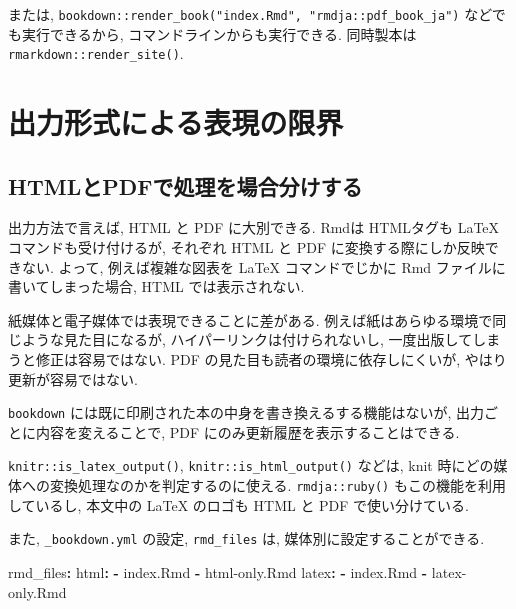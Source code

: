 \documentclass[
]{bxjsbook}
\newenvironment{Shaded}{\begin{snugshade}}{\end{snugshade}}
\newcommand{\AttributeTok}[1]{\textcolor[rgb]{0.77,0.63,0.00}{#1}}
\newcommand{\FunctionTok}[1]{\textcolor[rgb]{0.00,0.00,0.00}{#1}}
\newcommand{\KeywordTok}[1]{\textcolor[rgb]{0.13,0.29,0.53}{\textbf{#1}}}
\theoremstyle{definition}
\theoremstyle{definition}
\theoremstyle{definition}
\theoremstyle{remark}
\begin{document}
または,
\texttt{bookdown::render\_book("index.Rmd",\ "rmdja::pdf\_book\_ja")}
などでも実行できるから, コマンドラインからも実行できる. 同時製本は
\texttt{rmarkdown::render\_site()}.

\hypertarget{ux51faux529bux5f62ux5f0fux306bux3088ux308bux8868ux73feux306eux9650ux754c}{%
\chapter{出力形式による表現の限界}\label{ux51faux529bux5f62ux5f0fux306bux3088ux308bux8868ux73feux306eux9650ux754c}}

\hypertarget{htmlux3068pdfux3067ux51e6ux7406ux3092ux5834ux5408ux5206ux3051ux3059ux308b}{%
\section{HTMLとPDFで処理を場合分けする}\label{htmlux3068pdfux3067ux51e6ux7406ux3092ux5834ux5408ux5206ux3051ux3059ux308b}}

出力方法で言えば, HTML と PDF に大別できる. Rmdは HTMLタグも LaTeX
コマンドも受け付けるが, それぞれ HTML と PDF
に変換する際にしか反映できない. よって, 例えば複雑な図表を LaTeX
コマンドでじかに Rmd ファイルに書いてしまった場合, HTML
では表示されない.

紙媒体と電子媒体では表現できることに差がある.
例えば紙はあらゆる環境で同じような見た目になるが,
ハイパーリンクは付けられないし, 一度出版してしまうと修正は容易ではない.
PDF の見た目も読者の環境に依存しにくいが, やはり更新が容易ではない.

\texttt{bookdown}
には既に印刷された本の中身を書き換えるする機能はないが,
出力ごとに内容を変えることで, PDF にのみ更新履歴を表示することはできる.

\texttt{knitr::is\_latex\_output()}, \texttt{knitr::is\_html\_output()}
などは, knit 時にどの媒体への変換処理なのかを判定するのに使える.
\texttt{rmdja::ruby()} もこの機能を利用しているし, 本文中の \LaTeX
のロゴも HTML と PDF で使い分けている.

また, \texttt{\_bookdown.yml} の設定, \texttt{rmd\_files} は,
媒体別に設定することができる.

\begin{Shaded}
\begin{Highlighting}[]
\FunctionTok{rmd\_files}\KeywordTok{:}
\AttributeTok{  }\FunctionTok{html}\KeywordTok{:}
\AttributeTok{    }\KeywordTok{{-}}\AttributeTok{ index.Rmd}
\AttributeTok{    }\KeywordTok{{-}}\AttributeTok{ html{-}only.Rmd}
\AttributeTok{  }\FunctionTok{latex}\KeywordTok{:}
\AttributeTok{    }\KeywordTok{{-}}\AttributeTok{ index.Rmd}
\AttributeTok{    }\KeywordTok{{-}}\AttributeTok{ latex{-}only.Rmd}
\end{Highlighting}
\end{Shaded}
\end{document}

